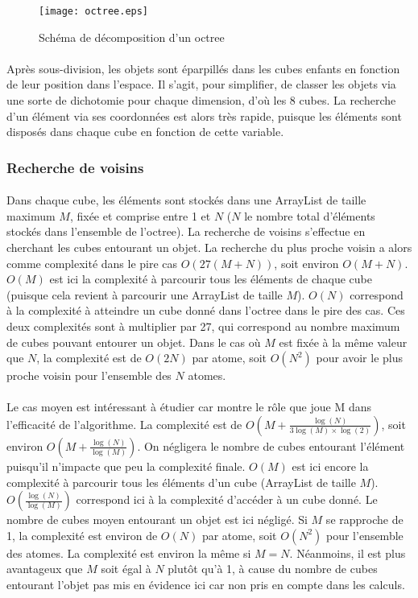 \begin{figure}[H]
\centering
\centerline{\texttt{[image: octree.eps]}}
\caption{Schéma de décomposition d'un octree}
\label{octree_img}
\end{figure}

\paragraph{}
Après sous-division, les objets sont éparpillés dans les cubes enfants en
fonction de leur position dans l'espace. Il s'agit, pour simplifier, de classer
les objets via une sorte de dichotomie pour chaque dimension, d'où les 8 cubes.
La recherche d'un élément via ses coordonnées est alors très rapide, puisque
les éléments sont disposés dans chaque cube en fonction de cette variable.


\subsubsection{Recherche de voisins}
\paragraph{}
Dans chaque cube, les éléments sont stockés dans une ArrayList de taille
maximum $M$, fixée et comprise entre 1 et $N$ ($N$ le nombre total d'éléments
stockés dans l'ensemble de l'octree). La recherche de voisins s'effectue en
cherchant les cubes entourant un objet. La recherche du plus proche voisin a
alors comme complexité dans le pire cas $O(27(M + N))$, soit environ $O(M+N)$.
$O(M)$ est ici la complexité à parcourir tous les éléments de chaque cube
(puisque cela revient à parcourir une ArrayList de taille $M$). $O(N)$
correspond à la complexité à atteindre un cube donné dans l'octree dans le pire
des cas. Ces deux complexités sont à multiplier par 27, qui correspond au
nombre maximum de cubes pouvant entourer un objet. Dans le cas où $M$ est fixée
à la même valeur que $N$, la complexité est de $O(2N)$ par atome, soit $O(N^2)$
pour avoir le plus proche voisin pour l'ensemble des $N$ atomes.

\paragraph{}
Le cas moyen est intéressant à étudier car montre le rôle que joue M dans
l'efficacité de l'algorithme. La complexité est de $O(M +
\frac{\log(N)}{3\log(M)\times{}\log(2)})$, soit environ $O(M +
\frac{\log(N)}{\log(M)})$. On négligera le nombre de cubes entourant l'élément
puisqu'il n'impacte que peu la complexité finale. $O(M)$ est ici encore la
complexité à parcourir tous les éléments d'un cube (ArrayList de taille $M$).
$O(\frac{\log(N)}{\log(M)})$ correspond ici à la complexité d'accéder à un cube
donné. Le nombre de cubes moyen entourant un objet est ici négligé. Si $M$ se
rapproche de 1, la complexité est environ de $O(N)$ par atome, soit $O(N^2)$
pour l'ensemble des atomes. La complexité est environ la même si $M = N$.
Néanmoins, il est plus avantageux que $M$ soit égal à $N$ plutôt qu'à 1, à
cause du nombre de cubes entourant l'objet pas mis en évidence ici car non pris
en compte dans les calculs.


